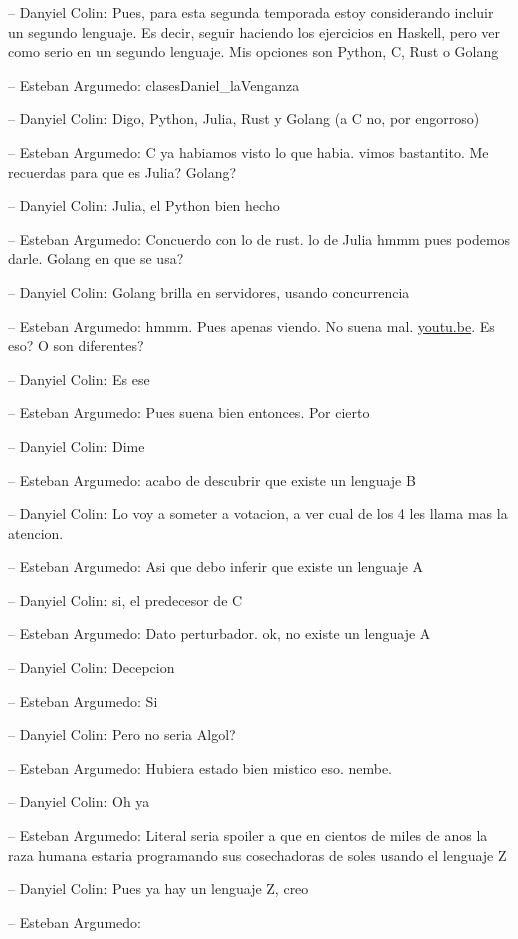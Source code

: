 -- Danyiel Colin: Pues, para esta segunda temporada estoy considerando
incluir un segundo lenguaje. Es decir, seguir haciendo los ejercicios en
Haskell, pero ver como serio en un segundo lenguaje. Mis opciones son
Python, C, Rust o Golang

-- Esteban Argumedo: clasesDaniel\_laVenganza

-- Danyiel Colin: Digo, Python, Julia, Rust y Golang (a C no, por
engorroso)

-- Esteban Argumedo: C ya habiamos visto lo que habia. vimos bastantito.
Me recuerdas para que es Julia? Golang?

-- Danyiel Colin: Julia, el Python bien hecho

-- Esteban Argumedo: Concuerdo con lo de rust. lo de Julia hmmm pues
podemos darle. Golang en que se usa?

-- Danyiel Colin: Golang brilla en servidores, usando concurrencia

-- Esteban Argumedo: hmmm. Pues apenas viendo. No suena mal.
\href{https://youtu.be/446E-r0rXHI}{youtu.be}. Es eso? O son diferentes?

-- Danyiel Colin: Es ese

-- Esteban Argumedo: Pues suena bien entonces. Por cierto

-- Danyiel Colin: Dime

-- Esteban Argumedo: acabo de descubrir que existe un lenguaje B

-- Danyiel Colin: Lo voy a someter a votacion, a ver cual de los 4 les
llama mas la atencion.

-- Esteban Argumedo: Asi que debo inferir que existe un lenguaje A

-- Danyiel Colin: si, el predecesor de C

-- Esteban Argumedo: Dato perturbador. ok, no existe un lenguaje A

-- Danyiel Colin: Decepcion

-- Esteban Argumedo: Si

-- Danyiel Colin: Pero no seria Algol?

-- Esteban Argumedo: Hubiera estado bien mistico eso. nembe.

-- Danyiel Colin: Oh ya

-- Esteban Argumedo: Literal seria spoiler a que en cientos de miles de
anos la raza humana estaria programando sus cosechadoras de soles usando
el lenguaje Z

-- Danyiel Colin: Pues ya hay un lenguaje Z, creo

-- Esteban Argumedo:

